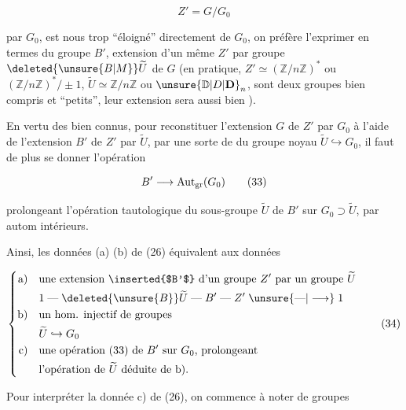 
\[ Z'=G/G_0 \tag*{(32)} \]

par $G_0$, est  nous trop ``éloigné'' directement de $G_0$, on préfère l'exprimer en termes du groupe $B'$, extension d'un même $Z'$ par   groupe $\deleted{\unsure{B|M}}\widetilde U$ de $G$ (en pratique, $Z'\simeq(\mathbb Z/n\mathbb Z)^*$ ou $(\mathbb Z/n\mathbb Z)^*/\pm1$, $\widetilde U\simeq\mathbb Z/n\mathbb Z$ ou $\unsure{\mathbb D|D|\mathbf D}_n$, sont deux groupes bien compris et ``petits'', leur extension sera aussi bien ).

En vertu des  bien connus, pour reconstituer l'extension $G$ de $Z'$ par $G_0$ à l'aide de l'extension $B'$ de $Z'$ par $\widetilde U$, par une sorte de   du groupe noyau $\widetilde U\hookrightarrow G_0$, il faut de plus se donner l'opération

\[ B'\mathrel{\longrightarrow}\operatorname{Aut}_{\rm gr}(G_0) \tag*{(33)} \]

prolongeant l'opération tautologique du sous-groupe $\widetilde U$ de $B'$ sur $G_0\supset\widetilde U$, par autom intérieurs.

Ainsi, les données (a) (b) de (26) équivalent aux données

\[
\left\{\begin{aligned}
\text{a)}\quad&\text{une extension \inserted{$B'$} d'un groupe $Z'$ par un groupe $\widetilde U$}\\
 &1\mathrel{\text{---}}\deleted{\unsure{B}}\widetilde U\mathrel{\text{---}}B'\mathrel{\text{---}}Z'\mathrel{\unsure{\text{---}|\longrightarrow}}1\\
\text{b)}\quad&\text{un hom. injectif de groupes}\\
 &\widetilde U\hookrightarrow G_0\\
\text{c)}\quad&\text{une opération (33) de $B'$ sur $G_0$, prolongeant}\\
 &\text{l'opération de $\widetilde U$ déduite de b).}
\end{aligned}\right.\tag*{(34)}
\]

Pour interpréter la donnée c) de (26), on commence à noter   de groupes

